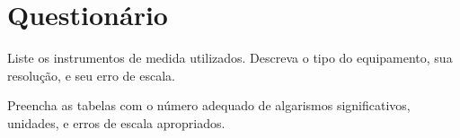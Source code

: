 \cleardoublepage


\vspace{15mm}

\begin{fullwidth}
\noindent{}
\vspace{5mm}

\noindent{}

\noindent{}

\noindent{}

\noindent{}

\noindent{}
\end{fullwidth}

\vspace{5mm}

\section{Questionário}

\begin{question}[type={exam}]{1}
Liste os instrumentos de medida utilizados. Descreva o tipo do equipamento, sua resolução, e seu erro de escala.
\end{question}

\begin{question}[type={exam}]{2}
Preencha as tabelas com o número adequado de algarismos significativos, unidades, e erros de escala apropriados. 
\end{question}

